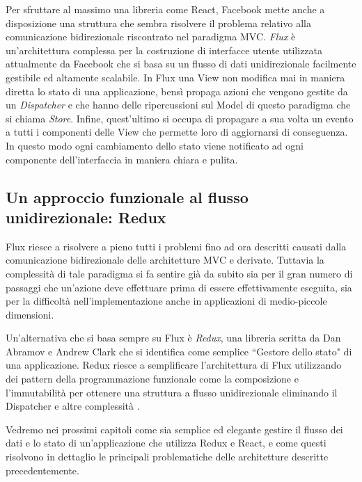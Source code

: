 Per sfruttare al massimo una libreria come React, Facebook mette anche a disposizione una struttura che sembra risolvere il problema relativo alla comunicazione bidirezionale riscontrato nel paradigma MVC. \textit{Flux} è un'architettura complessa per la costruzione di interfacce utente utilizzata attualmente da Facebook che si basa su un flusso di dati unidirezionale facilmente gestibile ed altamente scalabile. In Flux una View non modifica mai in maniera diretta lo stato di una applicazione, bensì propaga azioni che vengono gestite da un \textit{Dispatcher} e che hanno delle ripercussioni sul Model di questo paradigma che si chiama \textit{Store}. Infine, quest'ultimo si occupa di propagare a sua volta un evento a tutti i componenti delle View che permette loro di aggiornarsi di conseguenza. In questo modo ogni cambiamento dello stato viene notificato ad ogni componente dell'interfaccia in maniera chiara e pulita.

\subsection{Un approccio funzionale al flusso unidirezionale: Redux}
Flux riesce a risolvere a pieno tutti i problemi fino ad ora descritti causati dalla comunicazione bidirezionale delle architetture MVC e derivate. Tuttavia la complessità di tale paradigma si fa sentire già da subito sia per il gran numero di passaggi che un'azione deve effettuare prima di essere effettivamente eseguita, sia per la difficoltà nell'implementazione anche in applicazioni di medio-piccole dimensioni.

Un'alternativa che si basa sempre su Flux è \textit{Redux}, una libreria scritta da Dan Abramov e Andrew Clark che si identifica come semplice “Gestore dello stato" di una applicazione. Redux riesce a semplificare l'architettura di Flux utilizzando dei pattern della programmazione funzionale come la composizione e l'immutabilità per ottenere una struttura a flusso unidirezionale eliminando il Dispatcher e altre complessità \cite{AbramovOnReduxVsFlux}.

Vedremo nei prossimi capitoli come sia semplice ed elegante gestire il flusso dei dati e lo stato di un'applicazione che utilizza Redux e React, e come questi risolvono in dettaglio le principali problematiche delle architetture descritte precedentemente.